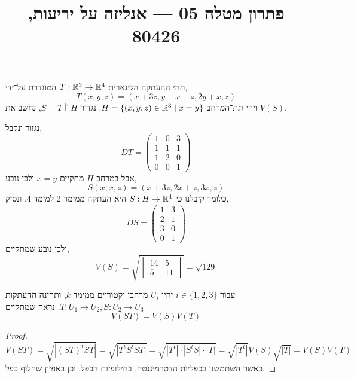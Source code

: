 
\title{פתרון מטלה 05 --- אנליזה על יריעות, 80426}

\DeclareMathOperator{\vol}{vol}


\maketitle
\maketitleprint[teal]

\question{}
\subquestion{}
תהי ההעתקה הלינארית $T : \mathbb{R}^3 \to \mathbb{R}^4$ המוגדרת על־ידי,
\[
	T(x, y, z)
	= (x + 3z, y + x + z, 2y + x, z)
\]
ויהי תת־המרחב $H = \{(x, y, z) \in \mathbb{R}^3 \mid x = y \}$.
נגדיר $S = T \restriction H$, נחשב את $V(S)$.
\begin{solution}
	נגזור ונקבל,
	\[
		D T
		= \begin{pmatrix}
			1 & 0 & 3 \\
			1 & 1 & 1 \\
			1 & 2 & 0 \\
			0 & 0 & 1
		\end{pmatrix}
	\]
	אבל במרחב $H$ מתקיים $x = y$ ולכן נובע,
	\[
		S(x, x, z)
		= (x + 3z, 2x + z, 3x, z)
	\]
	כלומר קיבלנו כי $S : H \to \mathbb{R}^4$ היא העתקה ממימד 2 למימד 4, ונסיק,
	\[
		D S
		= \begin{pmatrix}
			1 & 3 \\
			2 & 1 \\
			3 & 0 \\
			0 & 1
		\end{pmatrix}
	\]
	ולכן נובע שמתקיים,
	\[
		V(S) = \sqrt{\begin{vmatrix}
				14 & 5 \\
				5 & 11
		\end{vmatrix}}
		= \sqrt{129}
	\]
\end{solution}

\subquestion{}
עבור $i \in \{1, 2, 3\}$ יהיו $U_i$ מרחבי וקטוריים ממימד $k$, ותהינה ההעתקות $T : U_1 \to U_2, S : U_2 \to U_3$.
נראה שמתקיים
\[
	V(ST) = V(S) V(T)
\]
\begin{proof}
	\[
		V(ST)
		= \sqrt{|{(ST)}^t ST|}
		= \sqrt{|T^t S^t ST|}
		= \sqrt{|T^t| \cdot |S^t S| \cdot |T|}
		= \sqrt{|T^t|} V(S) \sqrt{|T|}
		= V(S) V(T)
	\]
	כאשר השתמשנו בכפליות הדטרמיננטה, בחילופיות הכפל, וכן באפיון שחלוף כפל.
\end{proof}

